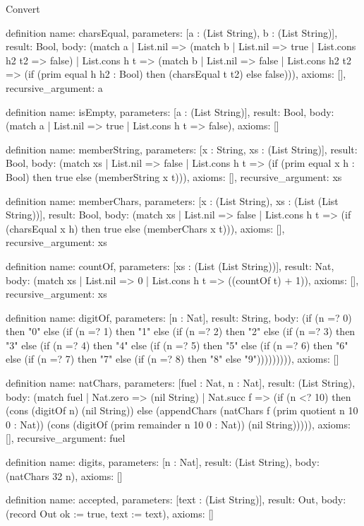 \begin{lexlean}{Convert}
\begin{semanticmodule}
definition{
  name: charsEqual,
  parameters: [a : (List String), b : (List String)],
  result: Bool,
  body: (match a
    | List.nil => (match b
    | List.nil => true
    | List.cons h2 t2 => false)
    | List.cons h t => (match b
    | List.nil => false
    | List.cons h2 t2 => (if (prim equal h h2 : Bool) then (charsEqual t t2) else false))),
  axioms: [],
  recursive_argument: a
}

definition{
  name: isEmpty,
  parameters: [a : (List String)],
  result: Bool,
  body: (match a
    | List.nil => true
    | List.cons h t => false),
  axioms: []
}

definition{
  name: memberString,
  parameters: [x : String, xs : (List String)],
  result: Bool,
  body: (match xs
    | List.nil => false
    | List.cons h t => (if (prim equal x h : Bool) then true else (memberString x t))),
  axioms: [],
  recursive_argument: xs
}

definition{
  name: memberChars,
  parameters: [x : (List String), xs : (List (List String))],
  result: Bool,
  body: (match xs
    | List.nil => false
    | List.cons h t => (if (charsEqual x h) then true else (memberChars x t))),
  axioms: [],
  recursive_argument: xs
}

definition{
  name: countOf,
  parameters: [xs : (List (List String))],
  result: Nat,
  body: (match xs
    | List.nil => 0
    | List.cons h t => ((countOf t) + 1)),
  axioms: [],
  recursive_argument: xs
}

definition{
  name: digitOf,
  parameters: [n : Nat],
  result: String,
  body: (if (n =? 0) then "0" else (if (n =? 1) then "1" else (if (n =? 2) then "2" else (if (n =? 3) then "3" else (if (n =? 4) then "4" else (if (n =? 5) then "5" else (if (n =? 6) then "6" else (if (n =? 7) then "7" else (if (n =? 8) then "8" else "9"))))))))),
  axioms: []
}

definition{
  name: natChars,
  parameters: [fuel : Nat, n : Nat],
  result: (List String),
  body: (match fuel
    | Nat.zero => (nil String)
    | Nat.succ f => (if (n <? 10) then (cons (digitOf n) (nil String)) else (appendChars (natChars f (prim quotient n 10 0 : Nat)) (cons (digitOf (prim remainder n 10 0 : Nat)) (nil String))))),
  axioms: [],
  recursive_argument: fuel
}

definition{
  name: digits,
  parameters: [n : Nat],
  result: (List String),
  body: (natChars 32 n),
  axioms: []
}

definition{
  name: accepted,
  parameters: [text : (List String)],
  result: Out,
  body: (record Out {ok := true, text := text}),
  axioms: []
}


\end{semanticmodule}
\end{lexlean}
